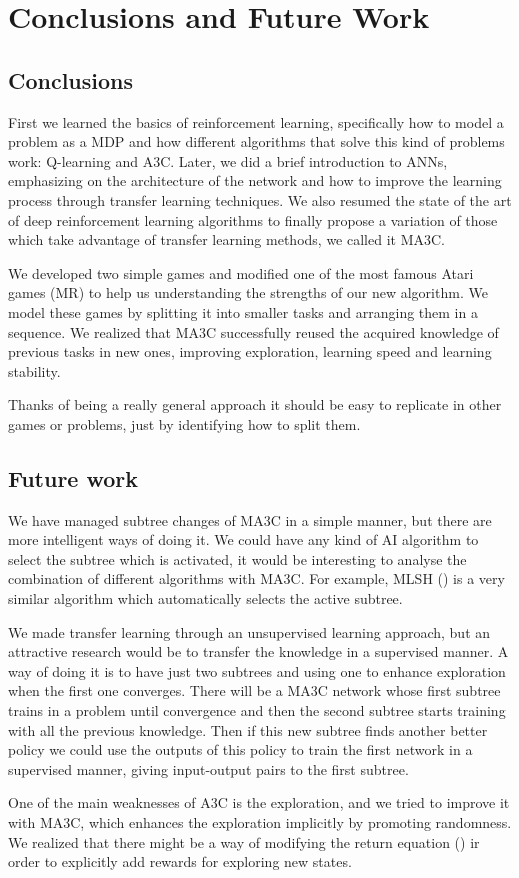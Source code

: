 \chapter{Conclusions and Future Work}
\section{Conclusions}
First we learned the basics of reinforcement learning, specifically how to model a problem as a \acl{MDP} and how different
algorithms that solve this kind of problems work: Q-learning and \acl{A3C}.
Later, we did a brief introduction to \aclp{ANN}, emphasizing on the architecture of the network and how to improve
the learning process through transfer learning techniques.
We also resumed the state of the art of deep reinforcement learning algorithms to finally propose a variation of those
which take advantage of transfer learning methods, we called it \acl{MA3C}.

We developed two simple games and modified one of the most famous Atari games (\acl{MR}) to help us understanding the
strengths of our new algorithm.
We model these games by splitting it into smaller tasks and arranging them in a sequence.
We realized that \ac{MA3C} successfully reused the acquired knowledge of previous tasks in new ones, improving exploration,
learning speed and learning stability.

Thanks of being a really general approach it should be easy to replicate in other games or problems, just by identifying
how to split them.

\section{Future work}

We have managed subtree changes of \ac{MA3C} in a simple manner, but there are more intelligent ways of doing it.
We could have any kind of \ac{AI} algorithm to select the subtree which is activated, it would be interesting to analyse
the combination of different algorithms with \ac{MA3C}.
For example, MLSH (\cite{frans2017meta}) is a very similar algorithm which automatically selects the active subtree.

We made transfer learning through an unsupervised learning approach, but an attractive research would be to transfer the
knowledge in a supervised manner.
A way of doing it is to have just two subtrees and using one to enhance exploration when the first one converges.
There will be a \ac{MA3C} network whose first subtree trains in a problem until convergence and then the second subtree
starts training with all the previous knowledge.
Then if this new subtree finds another better policy we could use the outputs of this policy to train the first network
in a supervised manner, giving input-output pairs to the first subtree.

One of the main weaknesses of \ac{A3C} is the exploration, and we tried to improve it with \ac{MA3C}, which enhances the
exploration implicitly by promoting randomness.
We realized that there might be a way of modifying the return equation () ir order to explicitly add
rewards for exploring new states.

